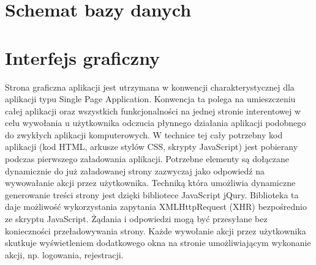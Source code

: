 \section{Schemat bazy danych}
\label{sec;modelBazyDanych}
\noindent
\begin{minipage}{\linewidth}
\end{minipage}

\section{Interfejs graficzny}
\label{sec:interfejsGraficzny}
Strona graficzna aplikacji jest utrzymana w konwencji charakterystycznej dla aplikacji typu Single Page Application\cite{spa}. Konwencja ta polega na umieszczeniu całej aplikacji oraz wszystkich funkcjonalności na jednej stronie interentowej w celu wywołania u użytkownika odczucia płynnego działania aplikacji podobnego do zwykłych aplikacji komputerowych. W technice tej cały potrzebny kod aplikacji (kod HTML, arkusze stylów CSS, skrypty JavaScript) jest pobierany podczas pierwszego załadowania aplikacji. Potrzebne elementy są dołączane dynamicznie do już załadowanej strony zazwyczaj jako odpowiedź na wywowałanie akcji przez użytkownika. Techniką która umożliwia dynamiczne generowanie treści strony jest dzięki bibliotece JavaScript jQury. Biblioteka ta daje możliwość wykorzystania zapytania XMLHttpRequest (XHR) bezpośrednio ze skryptu JavaScript. Żądania i odpowiedzi mogą być przesyłane bez konieczności przeładowywania strony. Każde wywołanie akcji przez użytkownika skutkuje wyświetleniem dodatkowego okna na stronie umożliwiającym wykonanie akcji, np. logowania, rejestracji.

